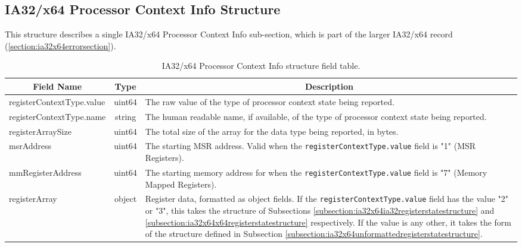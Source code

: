 \documentclass{report}
\newcommand*{\thead}[1]{\multicolumn{1}{|c|}{\bfseries #1}}
\newcommand*{\jsontable}[1]{
    \begin{table}[!ht]
    \label{#1}
    \centering
    \begin{adjustbox}{center}
    \begin{tabular}{|l|c|p{8cm}|}
    \hline
    \thead{Field Name} & \thead{Type} & \thead{Description} \\
    \hline
}
\newcommand*{\jsontableend}[1]{
    \hline
    \end{tabular}
    \end{adjustbox}
    \caption{#1}
    \label{table:#1}
    \end{table}
    \FloatBarrier
}
\begin{document}
\subsection{IA32/x64 Processor Context Info Structure}
\label{subsection:ia32x64processorcontextinfostructure}
This structure describes a single IA32/x64 Processor Context Info sub-section, which is part of the larger IA32/x64 record (\ref{section:ia32x64errorsection}).
\jsontable{table:ia32x64processorcontextinfostructure}
registerContextType.value & uint64 & The raw value of the type of processor context state being reported.\\
registerContextType.name & string & The human readable name, if available, of the type of processor context state being reported.\\
\hline
registerArraySize & uint64 & The total size of the array for the data type being reported, in bytes.\\
\hline
msrAddress & uint64 & The starting MSR address. Valid when the \texttt{registerContextType.value} field is "1" (MSR Registers).\\
\hline
mmRegisterAddress & uint64 & The starting memory address for when the \texttt{registerContextType.value} field is "7" (Memory Mapped Registers).\\
\hline
registerArray & object & Register data, formatted as object fields. If the \texttt{registerContextType.value} field has the value "2" or "3", this takes the structure of Subsections \ref{subsection:ia32x64ia32registerstatestructure} and \ref{subsection:ia32x64x64registerstatestructure} respectively. If the value is any other, it takes the form of the structure defined in Subsection \ref{subsection:ia32x64unformattedregisterstatestructure}.\\
\jsontableend{IA32/x64 Processor Context Info structure field table.}

\end{document}
